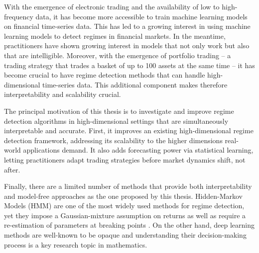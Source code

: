 \documentclass[12pt,a4paper]{report}
\begin{document}
With the emergence of electronic trading and the availability of low to high-frequency data, it has become more accessible to train machine learning models on financial time-series data. This has led to a growing interest in using machine learning models to detect regimes in financial markets.
In the meantime, practitioners have shown growing interest in models that not only work but also that are intelligible.
Moreover, with the emergence of portfolio trading -- a trading strategy that trades a basket of up to 100 assets at the same time -- it has become crucial to have regime detection methods that can handle high-dimensional time-series data. 
This additional component makes therefore interpretability and scalability crucial.

The principal motivation of this thesis is to investigate and improve regime detection algorithms in high-dimensional settings that are simultaneously interpretable and
accurate. First, it improves an existing high-dimensional regime detection framework, addressing its scalability to the higher dimensions real-world applications demand. It also adds forecasting power via statistical learning, letting practitioners adapt trading strategies before market dynamics shift, not after.

Finally, there are a limited number of methods that provide both interpretability and model-free approaches as the one proposed by this thesis. 
Hidden-Markov Models (HMM) are one of the most widely used methods for regime detection, yet they impose a Gaussian-mixture assumption on returns as well as  
require a re-estimation of parameters at breaking points \cite{BaiPerron2003}. On the other hand, deep learning methods are
well-known to be opaque \cite{HariomTatsat2025} and understanding their decision-making process is a key research topic in mathematics.

\end{document}
